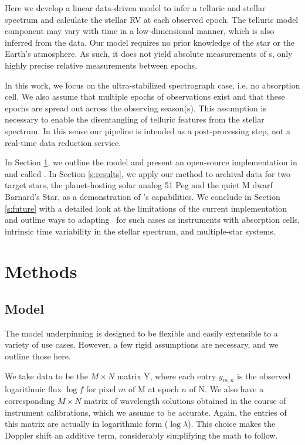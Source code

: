\documentclass[modern]{aastex62}
\newcommand{\Mdwarf}{Barnard's Star}
\begin{document}
Here we develop a linear data-driven model to infer a telluric and stellar spectrum and calculate the stellar RV at each observed epoch. 
The telluric model component may vary with time in a low-dimensional manner, which is also inferred from the data. 
Our model requires no prior knowledge of the star or the Earth's atmosphere. 
As such, it does not yield absolute measurements of \RV s, only highly precise relative measurements between epochs.

In this work, we focus on the ultra-stabilized spectrograph case, i.e. no absorption cell. 
We also assume that multiple epochs of observations exist and that these epochs are spread out across the observing season(s). 
This assumption is necessary to enable the disentangling of telluric features from the stellar spectrum. 
In this sense our pipeline is intended as a post-processing step, not a real-time data reduction service. 

In Section \ref{s:methods}, we outline the model and present an open-source implementation in \python and \TF called \wobble. 
In Section \ref{s:results}, we apply our method to \HARPS archival data for two target stars, the planet-hosting solar analog 51 Peg and the quiet M dwarf \Mdwarf, as a demonstration of \wobble's capabilities. 
We conclude in Section \ref{s:future} with a detailed look at the limitations of the current implementation and outline ways to adapting \wobble\ for such cases as instruments with absorption cells, intrinsic time variability in the stellar spectrum, and multiple-star systems.

\section{Methods}
\label{s:methods}
\subsection{Model}

The model underpinning \wobble is designed to be flexible and easily extensible to a variety of use cases. However, a few rigid assumptions are necessary, and we outline those here.

We take data to be the $M \times N$ matrix Y, where each entry $y_{m,n}$ is the observed logarithmic flux $\log f$ for pixel $m$ of M at epoch $n$ of N. We also have a corresponding $M \times N$ matrix of wavelength solutions obtained in the course of instrument calibrations, which we assume to be accurate. Again, the entries of this matrix are actually in logarithmic form ($\log \lambda$). This choice makes the Doppler shift an additive term, considerably simplifying the math to follow.
\end{document}
